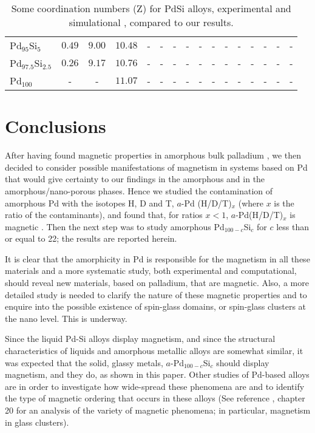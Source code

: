 \documentclass[fleqn,12pt]{wlscirep}
\begin{document}
\begin{table}[ht]
{\begin{tabular}{@{}lccccccccccccccc@{}}
Pd$_{95}$Si$_{5}$ & $0.49$ & $9.00$ & $10.48$ & - & - & - & - & - & - & - & - & - & - & - & - \\
Pd$_{97.5}$Si$_{2.5}$ & $0.26$ & $9.17$ & $10.76$ & - & - & - & - & - & - & - & - & - & - & - & - \\
Pd$_{100}$ & - & - & $11.07$ & - & - & - & - & - & - & - & - & - & - & - & - \\ \bottomrule
\bottomrule
\end{tabular}
}%
\caption{\label{tab:Table3}Some coordination numbers (Z) for PdSi alloys, experimental \cite{Wong_Guntherodt_book_1981, Ohkubo_2003, Nishi_1988} and simulational \cite{Nishi_1988, Boudreaux_1978}, compared to our results. }
\end{table}

\pagebreak

\section*{Conclusions}

After having found magnetic properties in amorphous bulk palladium \cite{Rodriguez_2019}, we then decided to consider possible manifestations of magnetism in systems based on Pd that would give certainty to our findings in the amorphous and in the amorphous/nano-porous phases. Hence we studied the contamination of amorphous Pd with the isotopes H, D and T, $a$-Pd (H/D/T)$_{x}$ (where $x$ is the ratio of the contaminants), and found that, for ratios $x < 1$, $a$-Pd(H/D/T)$_{x}$ is magnetic \cite{Rodriguez_supercond_2021}. Then the next step was to study amorphous Pd$_{100-c}$Si$_{c}$ for $c$ less than or equal to 22; the results are reported herein.

It is clear that the amorphicity in Pd is responsible for the magnetism in all these materials and a more systematic study, both experimental and computational, should reveal new materials, based on palladium, that are magnetic. Also, a more detailed study is needed to clarify the nature of these magnetic properties and to enquire into the possible existence of spin-glass domains, or spin-glass clusters at the nano level.  This is underway.

Since the liquid Pd-Si alloys display magnetism, and since the structural characteristics of liquids and amorphous metallic alloys are somewhat similar, it was expected that the solid, glassy metals, $a$-Pd$_{100-c}$Si$_{c}$ should display magnetism, and they do, as shown in this paper. Other studies of Pd-based alloys are in order to investigate how wide-spread these phenomena are and to identify the type of magnetic ordering that occurs in these alloys (See reference \cite{Handbook_2019}, chapter 20 for an analysis of the variety of magnetic phenomena; in particular, magnetism in glass clusters).
\end{document}
